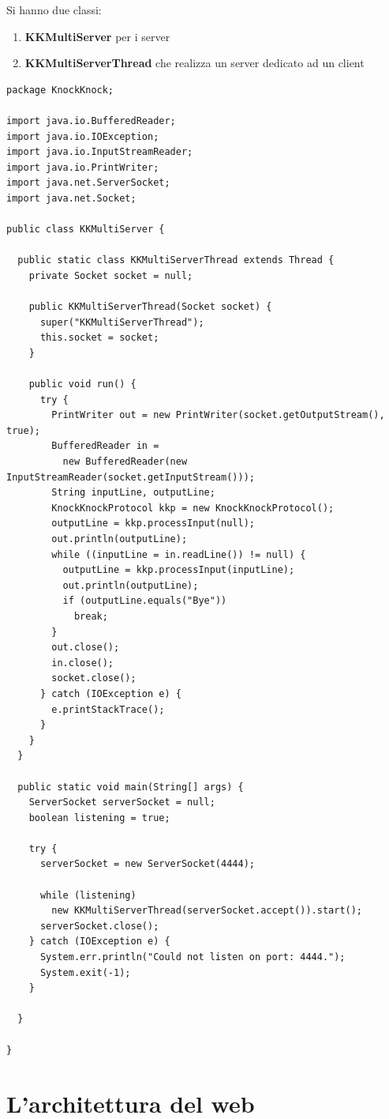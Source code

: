 \documentclass[a4paper,12pt, oneside]{book}
\begin{document}
Si hanno due classi:
\begin{enumerate}
\item \textbf{KKMultiServer} per i server
\item \textbf{KKMultiServerThread} che realizza un server dedicato ad un client
\end{enumerate} 
\begin{verbatim}
package KnockKnock;

import java.io.BufferedReader;
import java.io.IOException;
import java.io.InputStreamReader;
import java.io.PrintWriter;
import java.net.ServerSocket;
import java.net.Socket;

public class KKMultiServer {

  public static class KKMultiServerThread extends Thread {
    private Socket socket = null;

    public KKMultiServerThread(Socket socket) {
      super("KKMultiServerThread");
      this.socket = socket;
    }

    public void run() {
      try {
        PrintWriter out = new PrintWriter(socket.getOutputStream(), true);
        BufferedReader in = 
          new BufferedReader(new InputStreamReader(socket.getInputStream()));
        String inputLine, outputLine;
        KnockKnockProtocol kkp = new KnockKnockProtocol();
        outputLine = kkp.processInput(null);
        out.println(outputLine);
        while ((inputLine = in.readLine()) != null) {
          outputLine = kkp.processInput(inputLine);
          out.println(outputLine);
          if (outputLine.equals("Bye"))
            break;
        }
        out.close();
        in.close();
        socket.close();
      } catch (IOException e) {
        e.printStackTrace();
      }
    }
  }

  public static void main(String[] args) {
    ServerSocket serverSocket = null;
    boolean listening = true;

    try {
      serverSocket = new ServerSocket(4444);

      while (listening)
        new KKMultiServerThread(serverSocket.accept()).start();
      serverSocket.close();
    } catch (IOException e) {
      System.err.println("Could not listen on port: 4444.");
      System.exit(-1);
    }

  }

}

\end{verbatim}

\section{L'architettura del web}
\end{document}
